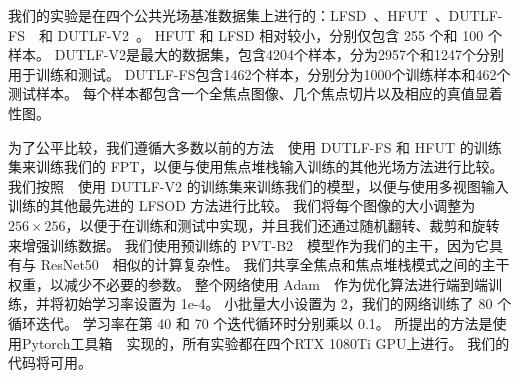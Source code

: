 我们的实验是在四个公共光场基准数据集上进行的：LFSD~\cite{li2014saliency}、HFUT~\cite{zhang2017saliency}、DUTLF-FS~\cite{zhang2019memory}~和 DUTLF-V2~\cite{piao2020dut}。 HFUT 和 LFSD 相对较小，分别仅包含 255 个和 100 个样本。 DUTLF-V2是最大的数据集，包含4204个样本，分为2957个和1247个分别用于训练和测试。 DUTLF-FS包含1462个样本，分别分为1000个训练样本和462个测试样本。 每个样本都包含一个全焦点图像、几个焦点切片以及相应的真值显着性图。

为了公平比较，我们遵循大多数以前的方法~\cite{piao2020exploit, liu2021light}~使用 DUTLF-FS 和 HFUT 的训练集来训练我们的 FPT，以便与使用焦点堆栈输入训练的其他光场方法进行比较。 我们按照~\cite{wang2022lfbcnet,jing2021occlusion}~使用 DUTLF-V2 的训练集来训练我们的模型，以便与使用多视图输入训练的其他最先进的 LFSOD 方法进行比较。 我们将每个图像的大小调整为 $256 \times 256$，以便于在训练和测试中实现，并且我们还通过随机翻转、裁剪和旋转来增强训练数据。
我们使用预训练的 PVT-B2~\cite{wang2022pvt}~模型作为我们的主干，因为它具有与 ResNet50~\cite{he2016deep}~相似的计算复杂性。 我们共享全焦点和焦点堆栈模式之间的主干权重，以减少不必要的参数。 整个网络使用 Adam~\cite{kingma2014adam}~作为优化算法进行端到端训练，并将初始学习率设置为 1e-4。 小批量大小设置为 2，我们的网络训练了 80 个循环迭代。 学习率在第 40 和 70 个迭代循环时分别乘以 0.1。 所提出的方法是使用Pytorch工具箱~\cite{paszke2017automatic}~实现的，所有实验都在四个RTX 1080Ti GPU上进行。 我们的代码将可用。 









